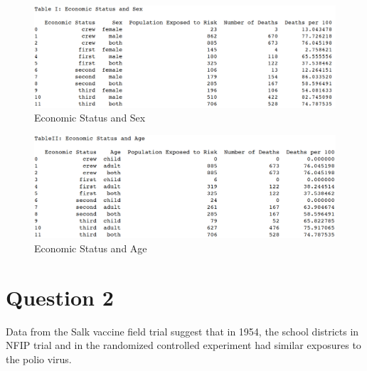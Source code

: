 \documentclass{article}
\begin{document}
\begin{figure}[h]
  \includegraphics[width=\linewidth]{q1a.png}
  \caption{Economic Status and Sex}
  \label{fig:fig1}
\end{figure}
\begin{figure}[h]
  \includegraphics[width=\linewidth]{q1b.png}
  \caption{Economic Status and Age}
  \label{fig:fig2}
\end{figure}
\section{Question 2}
Data from the Salk vaccine field trial suggest that in 1954, the school districts in NFIP trial and in the randomized controlled experiment had similar exposures to the polio virus.
\end{document}
